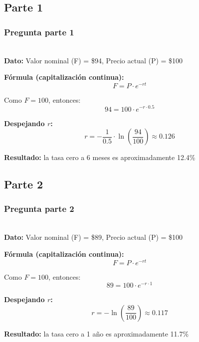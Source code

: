 \documentclass{beamer}
\newcommand{\taseis}{12.4\%}
\newcommand{\taunio}{11.7\%}
\newcommand{\Pseis}{100}    %
\newcommand{\Puno}{100}     %
\newcommand{\Fseis}{94}     %
\newcommand{\Funo}{89}      %
\newif\ifpresentacion
\newcommand{\pausa}{\ifpresentacion\pause\fi}
\begin{document}
\subsection{Parte 1}
\begin{frame}
  \frametitle{Pregunta  parte 1}
  \LARGE {} \\[1em]
  
  \footnotesize
  \textbf{Dato:} Valor nominal (F) = \$\Fseis, Precio actual (P) = \$\Pseis
  
  \pausa
  
  \textbf{Fórmula (capitalización continua):}
  \[
    F = P \cdot e^{-rt}
    \]
    
    \pausa
    
    Como $F = \Pseis$, entonces:
    \[
      \Fseis = \Pseis \cdot e^{-r \cdot 0.5}
      \]
      
      \pausa
      
      \textbf{Despejando $r$:}
      \[
        r = -\frac{1}{0.5} \cdot \ln\left(\frac{\Fseis}{\Pseis}\right) \approx 0.126
        \]
        
        \pausa
        
        \textbf{Resultado:} la tasa cero a 6 meses es aproximadamente \taseis
      \end{frame}
\subsection{Parte 2}
  \begin{frame}
    \frametitle{Pregunta  parte 2}
    \LARGE {} \\[1em]
    
    \footnotesize
    \textbf{Dato:} Valor nominal (F) = \$\Funo, Precio actual (P) = \$\Puno
    
    \pausa
    
  \textbf{Fórmula (capitalización continua):}
  \[
  F = P \cdot e^{-rt}
  \]

  \pausa

  Como $F = \Puno$, entonces:
  \[
  \Funo = \Puno \cdot e^{-r \cdot 1}
  \]

  \pausa

  \textbf{Despejando $r$:}
  \[
  r = -\ln\left(\frac{\Funo}{\Puno}\right) \approx 0.117
  \]

  \pausa

  \textbf{Resultado:} la tasa cero a 1 año es aproximadamente \taunio
  \end{frame}
\end{document}
